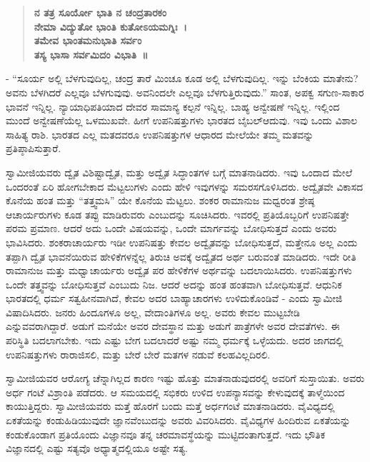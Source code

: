 \begin{verse}
\textbf{ನ ತತ್ರ ಸೂರ್ಯೋ ಭಾತಿ ನ ಚಂದ್ರತಾರಕಂ}\\\textbf{ನೇಮಾ ವಿದ್ಯುತೋ ಭಾಂತಿ ಕುತೋಽಯಮಗ್ನಿಃ~।}\\\textbf{ತಮೇವ ಭಾಂತಮನುಭಾತಿ ಸರ್ವಂ}\\\textbf{ತಸ್ಯ ಭಾಸಾ ಸರ್ವಮಿದಂ ವಿಭಾತಿ~॥}
\end{verse}

- “ಸೂರ್ಯ ಅಲ್ಲಿ ಬೆಳಗುವುದಿಲ್ಲ, ಚಂದ್ರ ತಾರೆ ಮಿಂಚೂ ಕೂಡ ಅಲ್ಲಿ ಬೆಳಗುವುದಿಲ್ಲ. ಇನ್ನು ಬೆಂಕಿಯ ಮಾತೇನು? ಅವನು ಬೆಳಗಿದರೆ ಎಲ್ಲವೂ ಬೆಳಗುವುವು. ಅವನಿಂದಲೇ ಎಲ್ಲವೂ ಬೆಳಗುತ್ತಿರುವುದು.” ಸಾಂತ, ಅಪಕ್ವ ಸಗುಣ-ಸಾಕಾರ ಭಾವನೆ ಇನ್ನಿಲ್ಲ. ನ್ಯಾಯಾಧಿಪತಿಯಾದ ದೇವರ ಸಾಮಾನ್ಯ ಕಲ್ಪನೆ ಇನ್ನಿಲ್ಲ. ಬಾಹ್ಯ ಅನ್ವೇಷಣೆ ಇನ್ನಿಲ್ಲ. ಇಲ್ಲಿಂದ ಮುಂದೆ ಅನ್ವೇಷಣೆಯೆಲ್ಲ ಒಳಮುಖವೇ. ಹೀಗೆ ಉಪನಿಷತ್ತುಗಳು ಭಾರತದ ಬೈಬಲ್​ ಆದುವು. ಇವು ಒಂದು ವಿಶಾಲ ಸಾಹಿತ್ಯ ರಾಶಿ. ಭಾರತದ ಎಲ್ಲ ಮತದವರೂ ಉಪನಿಷತ್ತುಗಳ ಆಧಾರದ ಮೇಲೆಯೇ ತಮ್ಮ ಮತವನ್ನು ಪ್ರತಿಪ್ಠಾಪಿಸುತ್ತಾರೆ.

ಸ್ವಾಮೀಜಿಯವರು ದ್ವೈತ ವಿಶಿಷ್ಟಾದ್ವೈತ, ಮತ್ತು ಅದ್ವೈತ ಸಿದ್ಧಾಂತಗಳ ಬಗ್ಗೆ ಮಾತನಾಡಿದರು. ಇವು ಒಂದಾದ ಮೇಲೆ ಒಂದರಂತೆ ಏರಿ ಹೋಗಬೇಕಾದ ಮೆಟ್ಟಲುಗಳು ಎಂದು ಹೇಳಿ ಇವುಗಳನ್ನು ಸಮರಸಗೊಳಿಸಿದರು. ಅದ್ವೈತವೇ ವಿಕಾಸದ ಕೊನೆಯ ಹಂತ ಮತ್ತು “ತತ್ತ್ವಮಸಿ” ಯೇ ಕೊನೆಯ ಮೆಟ್ಟಲು. ಶಂಕರ ರಾಮಾನುಜ ಮಧ್ವರಂತ ಶ್ರೇಷ್ಠ ಆಚಾರ್ಯರುಗಳು ಕೂಡ ತಪ್ಪು ಮಾಡಿರುವರು ಎಂಬುದನ್ನು ಸೂಚಿಸಿದರು. ಇವರಲ್ಲಿ ಪ್ರತಿಯೊಬ್ಬರಿಗೆ ಉಪನಿಷತ್ತೇ ಪರಮ ಪ್ರಮಾಣ. ಆದರೆ ಅದು ಒಂದೇ ವಿಷಯವನ್ನು, ಒಂದೇ ಮಾರ್ಗವನ್ನು ಬೋಧಿಸುತ್ತದೆ ಎಂದು ಅವರು ಭಾವಿಸಿದರು. ಶಂಕರಾಚಾರ್ಯರು ಇಡೀ ಉಪನಿಷತ್ತು ಕೇವಲ ಅದ್ವೈತವನ್ನು ಬೋಧಿಸುತ್ತದೆ, ಮತ್ತೇನೂ ಅಲ್ಲ ಎಂದು ತಪ್ಪಾಗಿ ದ್ವೈತ ಭಾವನೆಯಿರುವ ಹೇಳಿಕೆಗಳನ್ನೆಲ್ಲ ತಿರುಚಿ ಅವಕ್ಕೆ ಅದ್ವೈತದ ಅರ್ಥ ಬರುವಂತೆ ಮಾಡಿದರು. ಇದೇ ರೀತಿ ರಾಮಾನುಜ ಮತ್ತು ಮಧ್ವಾಚಾರ್ಯರು ಅದ್ವೈತ ಪರ ಹೇಳಿಕೆಗಳ ಅರ್ಥವನ್ನು ಬದಲಾಯಿಸಿದರು. ಉಪನಿಷತ್ತುಗಳು ಒಂದೇ ತತ್ತ್ವವನ್ನು ಬೋಧಿಸುತ್ತವೆ ಎಂಬುದು ನಿಜ. ಆದರೆ ಅದನ್ನು ಹಂತ ಹಂತವಾಗಿ ಬೋಧಿಸುತ್ತವೆ. ಆಧುನಿಕ ಭಾರತದಲ್ಲಿ ಧರ್ಮ ಸತ್ವಹೀನವಾಗಿದೆ, ಕೇವಲ ಅದರ ಬಾಹ್ಯಾಚಾರಗಳು ಉಳಿದುಕೊಂಡಿವೆ - ಎಂದು ಸ್ವಾಮೀಜಿ ವಿಷಾದಿಸಿದರು. ಜನರು ಹಿಂದೂಗಳೂ ಅಲ್ಲ, ವೇದಾಂತಿಗಳೂ ಅಲ್ಲ. ಅವರು ಕೇವಲ ಮುಟ್ಟಬೇಡಿ ಎನ್ನುವವರಾಗಿದ್ದಾರೆ. ಅಡುಗೆ ಮನೆಯೇ ಅವರ ದೇವಸ್ಥಾನ ಮತ್ತು ಅಡುಗೆ ಪಾತ್ರೆಗಳೇ ಅವರ ದೇವತೆಗಳು. ಈ ಪರಿಸ್ಥಿತಿ ಬದಲಾಗಬೇಕು. ಇದು ಎಷ್ಟು ಬೇಗ ಬದಲಾದರೆ ಅಷ್ಟು ನಮ್ಮ ಧರ್ಮಕ್ಕೆ ಒಳ್ಳೆಯದು. ಅದರ ಜಾಗದಲ್ಲಿ ಉಪನಿಷತ್ತುಗಳು ರಾರಾಜಿಸಲಿ, ಮತ್ತು ಬೇರೆ ಬೇರೆ ಮತಗಳ ನಡುವೆ ಕಲಹವಿಲ್ಲದಿರಲಿ.

ಸ್ವಾಮೀಜಿಯವರ ಆರೋಗ್ಯ ಚೆನ್ನಾಗಿಲ್ಲದ ಕಾರಣ ಇಷ್ಟು ಹೊತ್ತು ಮಾತನಾಡುವುದರಲ್ಲಿ ಅವರಿಗೆ ಸುಸ್ತಾಯಿತು. ಅವರು ಅರ್ಧ ಗಂಟೆ ವಿಶ್ರಾಂತಿ ಪಡೆದರು. ಆ ಸಮಯದಲ್ಲಿ ಸಭಿಕರು ಉಳಿದ ಉಪನ್ಯಾಸವನ್ನು ಕೇಳುವುದಕ್ಕೆ ತಾಳ್ಮೆಯಿಂದ ಕಾಯುತ್ತಿದ್ದರು. ಸ್ವಾಮೀಜಿಯವರು ಮತ್ತೆ ಹೊರಗೆ ಬಂದು ಮತ್ತೆ ಅರ್ಧಗಂಟೆ ಮಾತನಾಡಿದರು. ವೈವಿಧ್ಯದಲ್ಲಿ ಏಕತೆಯನ್ನು ಕಂಡುಹಿಡಿಯುವುದೇ ಜ್ಞಾನವೆಂಬುದನ್ನು ಅವರು ವಿವರಿಸಿದರು. ವೈವಿಧ್ಯಗಳ ಹಿಂದಿರುವ ಏಕತೆಯನ್ನು ಕಂಡುಕೊಂಡಾಗ ಪ್ರತಿಯೊಂದು ವಿಜ್ಞಾನವೂ ತನ್ನ ಚರಮಾವಸ್ಥೆಯನ್ನು ಮುಟ್ಟಿದಂತಾಗುತ್ತದೆ. ಇದು ಭೌತಿಕ ವಿಜ್ಞಾನದಲ್ಲಿ ಎಷ್ಟು ಸತ್ಯವೊ ಅಧ್ಯಾತ್ಮದಲ್ಲಿಯೂ ಅಷ್ಟೇ ಸತ್ಯ.

